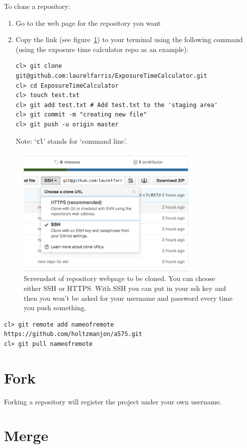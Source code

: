 \documentclass{article}
\begin{document}
To clone a repository:
\begin{enumerate}
    \item Go to the web page for the repository you want
    \item Copy the link (see figure~\ref{gitlink})
        to your terminal using the following command
        (using the exposure time calculator repo as an example):
\begin{verbatim}
cl> git clone git@github.com:laurelfarris/ExposureTimeCalculator.git
cl> cd ExposureTimeCalculator
cl> touch test.txt
cl> git add test.txt # Add test.txt to the 'staging area'
cl> git commit -m "creating new file"
cl> git push -u origin master
\end{verbatim}
        Note: `\texttt{cl}' stands for `command line'.
\end{enumerate}
\begin{figure}
\includegraphics[width=0.8\textwidth]{gitlink.png}
\caption{Screenshot of repository webpage to be cloned. You can choose
    either SSH or HTTPS\@. With SSH you can put in your ssh key and then
    you won't be asked for your username and password every time you push
    something.}
\label{gitlink}
\end{figure}

\begin{verbatim}
cl> git remote add nameofremote https://github.com/holtzmanjon/a575.git
cl> git pull nameofremote
\end{verbatim}

\section{Fork}
Forking a repository will register the project under your own username.

\section{Merge}
\end{document}
